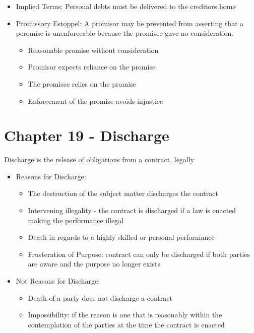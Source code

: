 \documentclass{article}
\begin{document}
\begin{itemize}
	    \item Implied Terms: Personal debts must be delivered to the creditors home
	    \item Promissory Estoppel: A promisor may be prevented from asserting that a peromise is unenforceable because the promisee gave no consideration.
	    \begin{itemize}
	      \item Reasonable promise without consideration
	      \item Promisor expects reliance on the promise
	      \item The promisee relies on the promise
	      \item Enforcement of the promise avoids injustice
	    \end{itemize}
	  \end{itemize}
	  \section*{Chapter 19 - Discharge}
	  Discharge is the release of obligations from a contract, legally
	    \begin{itemize}
	      \item Reasons for Discharge:
	      \begin{itemize}
	        \item The destruction of the subject matter discharges the contract
	        \item Intervening illegality - the contract is discharged if a law is enacted making the performance illegal
			\item Death in regards to a highly skilled or personal performance
			 \item Frusteration of Purpose: contract can only be discharged if both parties are aware and the purpose no longer exists
	      \end{itemize}
		\item Not Reasons for Discharge:
		  \begin{itemize}
			\item Death of a party does not discharge a contract
			\item Impossibility: if the reason is one that is reasonably within the contemplation of the parties at the time the contract is enacted
			\end{itemize}	     
	    \end{itemize}
\end{document}
